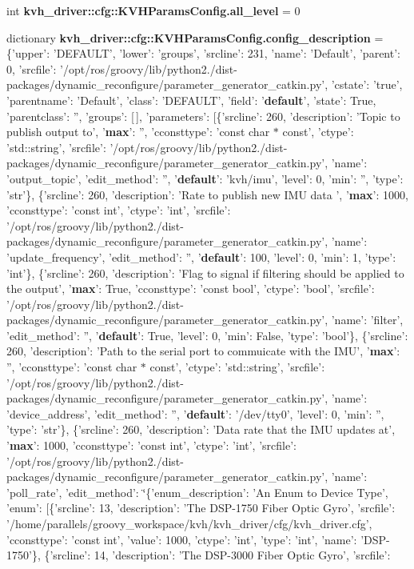 \begin{DoxyCompactItemize}
\item 
int {\bf kvh\-\_\-driver\-::cfg\-::\-K\-V\-H\-Params\-Config.\-all\-\_\-level} = 0
\item 
dictionary {\bf kvh\-\_\-driver\-::cfg\-::\-K\-V\-H\-Params\-Config.\-config\-\_\-description} = \{'upper'\-: '\-D\-E\-F\-A\-U\-L\-T', 'lower'\-: 'groups', 'srcline'\-: 231, 'name'\-: '\-Default', 'parent'\-: 0, 'srcfile'\-: '/opt/ros/groovy/lib/python2./dist-\/packages/dynamic\-\_\-reconfigure/parameter\-\_\-generator\-\_\-catkin.\-py', 'cstate'\-: 'true', 'parentname'\-: '\-Default', 'class'\-: '\-D\-E\-F\-A\-U\-L\-T', 'field'\-: '{\bf default}', 'state'\-: \-True, 'parentclass'\-: '', 'groups'\-: [$\,$], 'parameters'\-: [\{'srcline'\-: 260, 'description'\-: '\-Topic to publish output to', '{\bf max}'\-: '', 'cconsttype'\-: 'const char $\ast$ const', 'ctype'\-: 'std\-::string', 'srcfile'\-: '/opt/ros/groovy/lib/python2./dist-\/packages/dynamic\-\_\-reconfigure/parameter\-\_\-generator\-\_\-catkin.\-py', 'name'\-: 'output\-\_\-topic', 'edit\-\_\-method'\-: '', '{\bf default}'\-: 'kvh/imu', 'level'\-: 0, 'min'\-: '', 'type'\-: 'str'\}, \{'srcline'\-: 260, 'description'\-: '\-Rate to publish new \-I\-M\-U data ', '{\bf max}'\-: 1000, 'cconsttype'\-: 'const int', 'ctype'\-: 'int', 'srcfile'\-: '/opt/ros/groovy/lib/python2./dist-\/packages/dynamic\-\_\-reconfigure/parameter\-\_\-generator\-\_\-catkin.\-py', 'name'\-: 'update\-\_\-frequency', 'edit\-\_\-method'\-: '', '{\bf default}'\-: 100, 'level'\-: 0, 'min'\-: 1, 'type'\-: 'int'\}, \{'srcline'\-: 260, 'description'\-: '\-Flag to signal if filtering should be applied to the output', '{\bf max}'\-: \-True, 'cconsttype'\-: 'const bool', 'ctype'\-: 'bool', 'srcfile'\-: '/opt/ros/groovy/lib/python2./dist-\/packages/dynamic\-\_\-reconfigure/parameter\-\_\-generator\-\_\-catkin.\-py', 'name'\-: 'filter', 'edit\-\_\-method'\-: '', '{\bf default}'\-: \-True, 'level'\-: 0, 'min'\-: \-False, 'type'\-: 'bool'\}, \{'srcline'\-: 260, 'description'\-: '\-Path to the serial port to commuicate with the \-I\-M\-U', '{\bf max}'\-: '', 'cconsttype'\-: 'const char $\ast$ const', 'ctype'\-: 'std\-::string', 'srcfile'\-: '/opt/ros/groovy/lib/python2./dist-\/packages/dynamic\-\_\-reconfigure/parameter\-\_\-generator\-\_\-catkin.\-py', 'name'\-: 'device\-\_\-address', 'edit\-\_\-method'\-: '', '{\bf default}'\-: '/dev/tty0', 'level'\-: 0, 'min'\-: '', 'type'\-: 'str'\}, \{'srcline'\-: 260, 'description'\-: '\-Data rate that the \-I\-M\-U updates at', '{\bf max}'\-: 1000, 'cconsttype'\-: 'const int', 'ctype'\-: 'int', 'srcfile'\-: '/opt/ros/groovy/lib/python2./dist-\/packages/dynamic\-\_\-reconfigure/parameter\-\_\-generator\-\_\-catkin.\-py', 'name'\-: 'poll\-\_\-rate', 'edit\-\_\-method'\-: \char`\"{}\{'enum\-\_\-description'\-: '\-An \-Enum to \-Device \-Type', 'enum'\-: [\{'srcline'\-: 13, 'description'\-: '\-The \-D\-S\-P-\/1750 \-Fiber \-Optic \-Gyro', 'srcfile'\-: '/home/parallels/groovy\-\_\-workspace/kvh/kvh\-\_\-driver/cfg/kvh\-\_\-driver.\-cfg', 'cconsttype'\-: 'const int', 'value'\-: 1000, 'ctype'\-: 'int', 'type'\-: 'int', 'name'\-: '\-D\-S\-P-\/1750'\}, \{'srcline'\-: 14, 'description'\-: '\-The \-D\-S\-P-\/3000 \-Fiber \-Optic \-Gyro', 'srcfile'\-: 
\end{DoxyCompactItemize}
